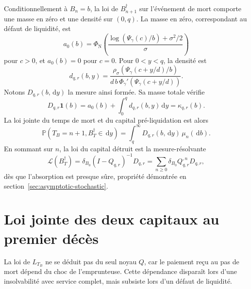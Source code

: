 \documentclass[11pt,a4paper]{article}
\newcommand{\Pp}{\mathbb P}
\newcommand{\1}{\mathbf 1}
\newcommand{\dd}{\,\mathrm d}
\newcommand{\Law}{\mathcal L}
\newcommand{\cim}{\dagger}
\theoremstyle{definition}
\theoremstyle{remark}
\begin{document}
Conditionnellement à $B_n=b$, la loi de $B_{n+1}^{\cim}$ sur l'événement
de mort comporte une masse en zéro et une densité sur $(0,q)$. La masse en
zéro, correspondant au défaut de liquidité, est
\begin{equation}
a_0(b)=
\Phi_{\mathrm N}\!\left(
\frac{\log(\Psi_\gamma(c)/b)+\sigma^2/2}{\sigma}
\right)
\label{eq:atom-zero}
\end{equation}
pour $c>0$, et $a_0(b)=0$ pour $c=0$. Pour $0<y<q$, la densité est
\begin{equation}
d_{q,r}(b,y)=
\frac{\rho_\sigma\!\left(
\Psi_\gamma(c+y/d)/b\right)}
{d\,b\,\Phi_\gamma'\!\left(\Psi_\gamma(c+y/d)\right)}.
\label{eq:death-density}
\end{equation}
Notons $D_{q,r}(b,\dd y)$ la mesure ainsi formée. Sa masse totale vérifie
\[
D_{q,r}\1(b)=a_0(b)+\int_0^q d_{q,r}(b,y)\dd y
=\kappa_{q,r}(b).
\]
La loi jointe du temps de mort et du capital pré-liquidation est alors
\begin{equation}
\boxed{\quad
\Pp(T_B=n+1,B_T^{\cim}\in\dd y)
=\int_q^\infty D_{q,r}(b,\dd y)\,\mu_n(\dd b).
\quad}
\label{eq:joint-T-B}
\end{equation}
En sommant sur $n$, la loi du capital détruit est la mesure-résolvante
\begin{equation}
\Law(B_T^{\cim})
=\delta_{B_0}(I-Q_{q,r})^{-1}D_{q,r}
=\sum_{n\geq0}\delta_{B_0}Q_{q,r}^{,n}D_{q,r},
\label{eq:resolvent-B}
\end{equation}
dès que l'absorption est presque sûre, propriété démontrée en
section~\ref{sec:asymptotic-stochastic}.

\section{Loi jointe des deux capitaux au premier décès}

La loi de $L_{T_B}$ ne se déduit pas du seul noyau $Q$, car le paiement
reçu au pas de mort dépend du choc de l'emprunteuse. Cette dépendance
disparaît lors d'une insolvabilité avec service complet, mais subsiste lors
d'un défaut de liquidité.
\end{document}
